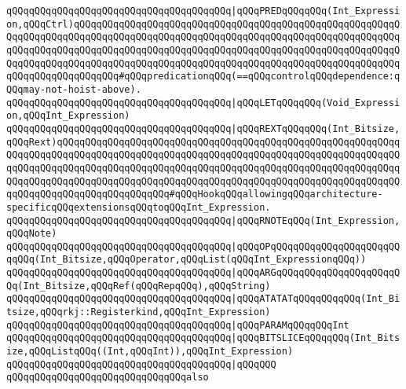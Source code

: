 \verb|qQQqqQQqqQQqqQQqqQQqqQQqqQQqqQQqqQQqqQQq|\verb#|qQQqPREDqQQqqQQq(Int_Expression,qQQqCtrl)qQQqqQQqqQQqqQQqqQQqqQQqqQQqqQQqqQQqqQQqqQQqqQQqqQQqqQQqqQQqqQQqqQQqqQQqqQQqqQQqqQQqqQQqqQQqqQQqqQQqqQQqqQQqqQQqqQQqqQQqqQQqqQQqqQQqqQQqqQQqqQQqqQQqqQQqqQQqqQQqqQQqqQQqqQQqqQQqqQQqqQQqqQQqqQQqqQQqqQQqqQQqqQQqqQQqqQQqqQQqqQQqqQQqqQQqqQQqqQQqqQQqqQQqqQQqqQQqqQQqqQQqqQQqqQQqqQQqqQQqqQQqqQQq#\verb|#qQQqpredicationqQQq(==qQQqcontrolqQQqdependence:qQQqmay-not-hoist-above).|\newline
\newline
\verb|qQQqqQQqqQQqqQQqqQQqqQQqqQQqqQQqqQQqqQQq|\verb#|qQQqLETqQQqqQQq(Void_Expression,qQQqInt_Expression)#\newline
\newline
\verb|qQQqqQQqqQQqqQQqqQQqqQQqqQQqqQQqqQQqqQQq|\verb#|qQQqREXTqQQqqQQq(Int_Bitsize,qQQqRext)qQQqqQQqqQQqqQQqqQQqqQQqqQQqqQQqqQQqqQQqqQQqqQQqqQQqqQQqqQQqqQQqqQQqqQQqqQQqqQQqqQQqqQQqqQQqqQQqqQQqqQQqqQQqqQQqqQQqqQQqqQQqqQQqqQQqqQQqqQQqqQQqqQQqqQQqqQQqqQQqqQQqqQQqqQQqqQQqqQQqqQQqqQQqqQQqqQQqqQQqqQQqqQQqqQQqqQQqqQQqqQQqqQQqqQQqqQQqqQQqqQQqqQQqqQQqqQQqqQQqqQQqqQQqqQQqqQQqqQQqqQQqqQQqqQQqqQQqqQQq#\verb|#qQQqHookqQQqallowingqQQqarchitecture-specificqQQqextensionsqQQqtoqQQqInt_Expression.|\newline
\newline
\verb|qQQqqQQqqQQqqQQqqQQqqQQqqQQqqQQqqQQqqQQq|\verb#|qQQqRNOTEqQQq(Int_Expression,qQQqNote)#\newline
\newline
\verb|qQQqqQQqqQQqqQQqqQQqqQQqqQQqqQQqqQQqqQQq|\verb#|qQQqOPqQQqqQQqqQQqqQQqqQQqqQQqqQQq(Int_Bitsize,qQQqOperator,qQQqList(qQQqInt_ExpressionqQQq))#\newline
\verb|qQQqqQQqqQQqqQQqqQQqqQQqqQQqqQQqqQQqqQQq|\verb#|qQQqARGqQQqqQQqqQQqqQQqqQQqqQQq(Int_Bitsize,qQQqRef(qQQqRepqQQq),qQQqString)#\newline
\verb|qQQqqQQqqQQqqQQqqQQqqQQqqQQqqQQqqQQqqQQq|\verb#|qQQqATATATqQQqqQQqqQQq(Int_Bitsize,qQQqrkj::Registerkind,qQQqInt_Expression)#\newline
\verb|qQQqqQQqqQQqqQQqqQQqqQQqqQQqqQQqqQQqqQQq|\verb#|qQQqPARAMqQQqqQQqInt#\newline
\verb|qQQqqQQqqQQqqQQqqQQqqQQqqQQqqQQqqQQqqQQq|\verb#|qQQqBITSLICEqQQqqQQq(Int_Bitsize,qQQqListqQQq((Int,qQQqInt)),qQQqInt_Expression)#\newline
\verb|qQQqqQQqqQQqqQQqqQQqqQQqqQQqqQQqqQQqqQQq|\verb#|qQQqQQQ#\newline
\newline
\verb|qQQqqQQqqQQqqQQqqQQqqQQqqQQqqQQqalso|\newline
